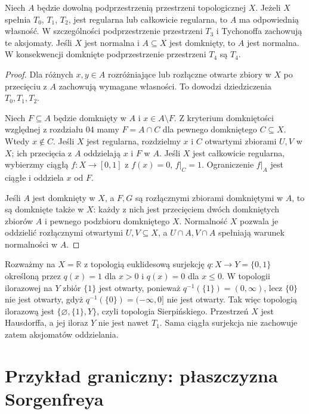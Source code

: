 \begin{stwierdzenie}
\label{prop:topog-oddzielanie-dziedziczenie}
Niech $A$ będzie dowolną podprzestrzenią przestrzeni topologicznej $X$.
Jeżeli $X$ spełnia $T_0$, $T_1$, $T_2$, jest regularna
lub całkowicie regularna, to $A$ ma odpowiednią własność.
W szczególności podprzestrzenie przestrzeni $T_3$
i Tychonoffa zachowują te aksjomaty.
Jeśli $X$ jest normalna i $A\subseteq X$ jest domknięty,
to $A$ jest normalna. W konsekwencji domknięte
podprzestrzenie przestrzeni $T_4$ są $T_4$.
\end{stwierdzenie}
\begin{proof}
Dla różnych $x,y\in A$ rozróżniające lub rozłączne
otwarte zbiory w $X$ po przecięciu z $A$ zachowują
wymagane własności. To dowodzi dziedziczenia $T_0,T_1,T_2$.

Niech $F\subseteq A$ będzie domknięty w $A$ i $x\in A\setminus F$.
Z kryterium domkniętości względnej
z rozdziału 04 mamy
$F=A\cap C$ dla pewnego domkniętego $C\subseteq X$.
Wtedy $x\notin C$. Jeśli $X$ jest regularna, rozdzielmy
$x$ i $C$ otwartymi zbiorami $U,V$ w $X$; ich przecięcia
z $A$ oddzielają $x$ i $F$ w $A$. Jeśli $X$ jest całkowicie
regularna, wybierzmy ciągłą $f\colon X\to[0,1]$
z $f(x)=0$, $f|_C=1$. Ograniczenie $f|_A$ jest ciągłe
i oddziela $x$ od $F$.

Jeśli $A$ jest domknięty w $X$, a $F,G$ są rozłącznymi
zbiorami domkniętymi w $A$, to są domknięte także w $X$:
każdy z nich jest przecięciem dwóch domkniętych zbiorów
$A$ i pewnego podzbioru domkniętego $X$. Normalność $X$
pozwala je oddzielić rozłącznymi otwartymi $U,V\subseteq X$,
a $U\cap A,V\cap A$ spełniają warunek normalności w $A$.
\end{proof}

\begin{uwaga}
\label{rem:topog-iloraz-nie-t2}
Rozważmy na $X=\mathbb R$ z topologią euklidesową
surjekcję $q\colon X\to Y=\{0,1\}$ określoną przez
$q(x)=1$ dla $x>0$ i $q(x)=0$ dla $x\le0$.
W topologii ilorazowej na $Y$ zbiór $\{1\}$ jest otwarty,
ponieważ $q^{-1}(\{1\})=(0,\infty)$, lecz $\{0\}$
nie jest otwarty, gdyż $q^{-1}(\{0\})=(-\infty,0]$
nie jest otwarty. Tak więc topologią ilorazową jest
$\{\varnothing,\{1\},Y\}$, czyli topologia Sierpińskiego.
Przestrzeń $X$ jest Hausdorffa, a jej iloraz $Y$ nie jest
nawet $T_1$. Sama ciągła surjekcja nie zachowuje zatem
aksjomatów oddzielania.
\end{uwaga}

\section{Przykład graniczny: płaszczyzna Sorgenfreya}
\label{sec:topog-sorgenfrey-normalnosc}

